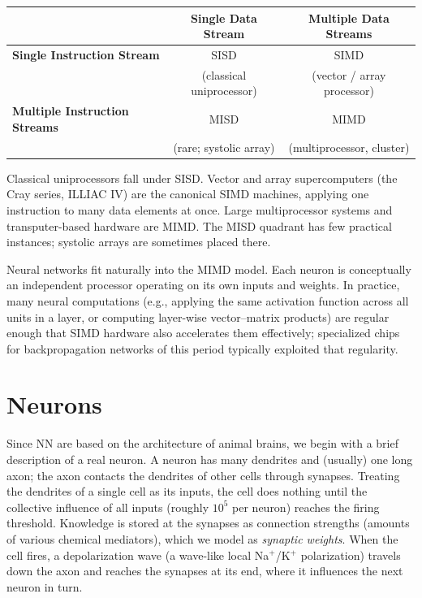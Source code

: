 \documentclass[12pt]{article}
\begin{document}
\begin{center}
\begin{tabular}{|l|c|c|}
\hline
 & \textbf{Single Data Stream} & \textbf{Multiple Data Streams} \\
\hline
\textbf{Single Instruction Stream}
  & SISD                 & SIMD                  \\
  & (classical uniprocessor) & (vector / array processor) \\
\hline
\textbf{Multiple Instruction Streams}
  & MISD                 & MIMD                  \\
  & (rare; systolic array) & (multiprocessor, cluster) \\
\hline
\end{tabular}
\end{center}

Classical uniprocessors fall under SISD. Vector and array supercomputers (the Cray series, ILLIAC IV) are the canonical SIMD machines, applying one instruction to many data elements at once. Large multiprocessor systems and transputer-based hardware are MIMD. The MISD quadrant has few practical instances; systolic arrays are sometimes placed there.

Neural networks fit naturally into the MIMD model. Each neuron is conceptually an independent processor operating on its own inputs and weights. In practice, many neural computations (e.g., applying the same activation function across all units in a layer, or computing layer-wise vector--matrix products) are regular enough that SIMD hardware also accelerates them effectively; specialized chips for backpropagation networks of this period typically exploited that regularity.

\section{Neurons}

Since NN are based on the architecture of animal brains, we begin with a brief description of a real neuron. A neuron has many dendrites and (usually) one long axon; the axon contacts the dendrites of other cells through synapses. Treating the dendrites of a single cell as its inputs, the cell does nothing until the collective influence of all inputs (roughly $10^5$ per neuron) reaches the firing threshold. Knowledge is stored at the synapses as connection strengths (amounts of various chemical mediators), which we model as \emph{synaptic weights}. When the cell fires, a depolarization wave (a wave-like local Na$^+$/K$^+$ polarization) travels down the axon and reaches the synapses at its end, where it influences the next neuron in turn.
\end{document}
